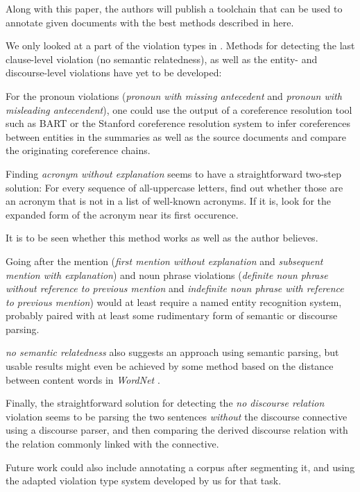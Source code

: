 \documentclass[a4paper,10pt]{scrartcl}
\theoremstyle{style}
\begin{document}
Along with this paper, the authors will publish a toolchain that can be used to annotate given documents with the best methods described in here.

We only looked at a part of the violation types in \cite{friedrichlqvsumm}. Methods for detecting the last clause-level violation (no semantic relatedness), as well as the entity- and discourse-level violations have yet to be developed:

For the pronoun violations (\textit{pronoun with missing antecedent} and \textit{pronoun with misleading antecendent}), one could use the output of a coreference resolution tool such as BART \citep{versley2008bart} or the Stanford coreference resolution system \citep{lee2011stanford} to infer coreferences between entities in the summaries as well as the source documents and compare the originating coreference chains.

Finding \textit{acronym without explanation} seems to have a straightforward two-step solution: For every sequence of all-uppercase letters, find out whether those are an acronym that is not in a list of well-known acronyms. If it is, look for the expanded form of the acronym near its first occurence.

It is to be seen whether this method works as well as the author believes.

Going after the mention (\textit{first mention without explanation} and \textit{subsequent mention with explanation}) and noun phrase violations (\textit{definite noun phrase without reference to previous mention} and \textit{indefinite noun phrase with reference to previous mention}) would at least require a named entity recognition system, probably paired with at least some rudimentary form of semantic or discourse parsing.

\textit{no semantic relatedness} also suggests an approach using semantic parsing, but usable results might even be achieved by some method based on the distance between content words in \textit{WordNet} \citep{fellbaum2005wordnet}.

Finally, the straightforward solution for detecting the \textit{no discourse relation} violation seems to be parsing the two sentences \textit{without} the discourse connective using a discourse parser, and then comparing the derived discourse relation with the relation commonly linked with the connective.

Future work could also include annotating a corpus after segmenting it, and using the adapted violation type system developed by us for that task.
\end{document}
